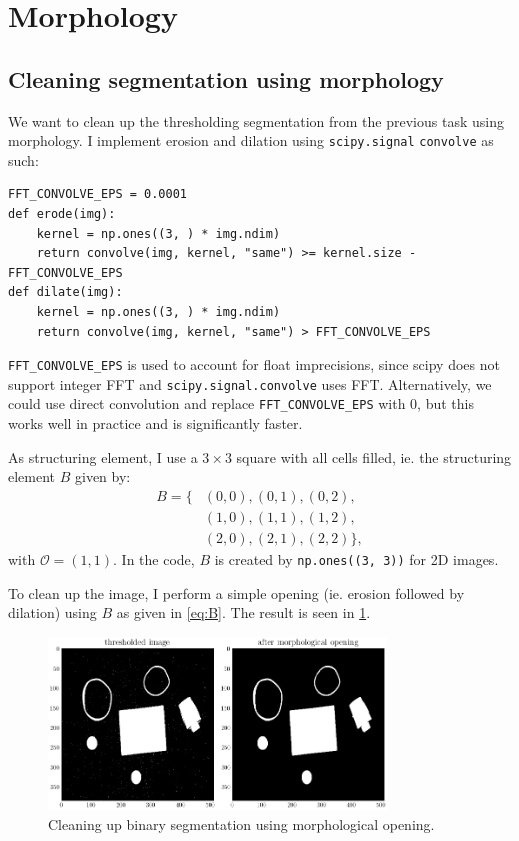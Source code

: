 \newpage
\section{Morphology}

\subsection{Cleaning segmentation using morphology}

We want to clean up the thresholding segmentation from the previous task using
morphology. I implement erosion and dilation using
{\footnotesize \texttt{scipy.signal} \texttt{convolve}} as such:
\begin{verbatim}
FFT_CONVOLVE_EPS = 0.0001
def erode(img):
    kernel = np.ones((3, ) * img.ndim)
    return convolve(img, kernel, "same") >= kernel.size - FFT_CONVOLVE_EPS
def dilate(img):
    kernel = np.ones((3, ) * img.ndim)
    return convolve(img, kernel, "same") > FFT_CONVOLVE_EPS
\end{verbatim}
\texttt{FFT\_CONVOLVE\_EPS} is used to account for float imprecisions, since
scipy does not support integer FFT and \texttt{scipy.signal.convolve} uses FFT.
Alternatively, we could use direct convolution and replace
\texttt{FFT\_CONVOLVE\_EPS} with 0, but this works well in practice and is
significantly faster.

As structuring element, I use a $3 \times 3$ square with all cells filled, ie.
the structuring element $B$ given by:
\begin{align}
  B = \{&(0, 0), (0, 1), (0, 2),\nonumber\\
        &(1, 0), (1, 1), (1, 2),\nonumber\\
        &(2, 0), (2, 1), (2, 2)\}\label{eq:B},
\end{align}
with $\mathcal O = (1, 1)$. In the code, $B$ is created by
\texttt{np.ones((3, 3))} for 2D images.

To clean up the image, I perform a simple opening (ie. erosion followed by
dilation) using $B$ as given in \cref{eq:B}. The result is seen in
\cref{fig:5.1}.

\begin{figure}[H]
    \centering
    \includegraphics[width=0.8\textwidth]{figures/task_5_1.png}
    \caption{Cleaning up binary segmentation using morphological opening.}
    \label{fig:5.1}
\end{figure}

